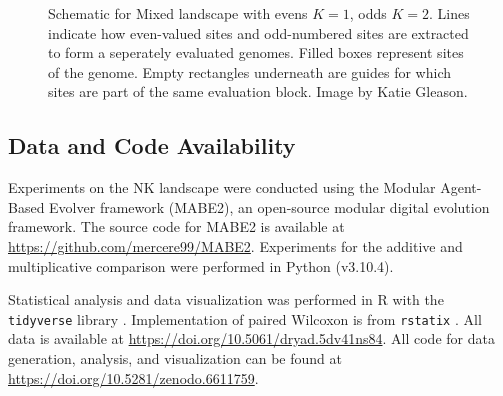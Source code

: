 \begin{figure}
    \centering
    \caption{Schematic for Mixed landscape with evens $K=1$, odds $K=2$. Lines indicate how even-valued sites and odd-numbered sites are extracted to form a seperately evaluated genomes. Filled boxes represent sites of the genome. Empty rectangles underneath are guides for which sites are part of the same evaluation block. Image by Katie Gleason.}
    \label{fig:method:half}
\end{figure}


\subsection{Data and Code Availability}

Experiments on the NK landscape were conducted using the Modular Agent-Based Evolver framework (MABE2), an open-source modular digital evolution framework. The source code for MABE2 is available at \url{https://github.com/mercere99/MABE2}. Experiments for the additive and multiplicative comparison were performed in Python (v3.10.4).

Statistical analysis and data visualization was performed in R \citep{r_core_team_r_2019} with the \texttt{tidyverse} library \citep{wickham_welcome_2019}. Implementation of paired Wilcoxon is from \texttt{rstatix} \citep{kassambara_rstatix_2021}.
All data is available at \url{https://doi.org/10.5061/dryad.5dv41ns84}. 
All code for data generation, analysis, and visualization can be found at \url{https://doi.org/10.5281/zenodo.6611759}.